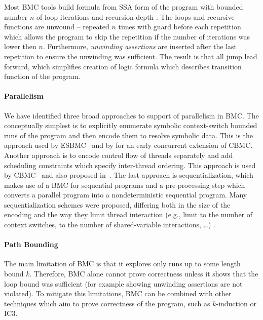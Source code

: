 Most BMC tools build formula from SSA form of the program with bounded number $n$ of loop iterations and recursion depth .
The loops and recursive functions are unwound -- repeated $n$ times with guard before each repetition which allows the program to skip the repetition if the number of iterations was lower then $n$.
Furthermore, \emph{unwinding assertions} are inserted after the last repetition to ensure the unwinding was sufficient.
The result is that all jump lead forward, which simplifies creation of logic formula which describes transition function of the program.

\paragraph{Parallelism}

We have identified three broad approaches to support of parallelism in BMC.
The conceptually simplest is to explicitly enumerate symbolic context-switch
bounded runs of the program and then encode them to resolve symbolic data.
This is the approach used by ESBMC~ and by
 for an early concurrent extension of CBMC.
Another approach is to encode control flow of threads separately and add scheduling constraints which specify inter-thread ordering.
This approach is used by CBMC~ and also proposed in~.
The last approach is sequentialization, which makes use of a BMC for sequential programs and a pre-processing step which converts a parallel program into a nondeterministic sequential program.
Many sequentialization schemes were proposed, differing both in the size of the encoding and the way they limit thread interaction (e.g., limit to the number of context switches, to the number of shared-variable interactions, …) .

\paragraph{Path Bounding}

The main limitation of BMC is that it explores only runs up to some length
bound $k$.
Therefore, BMC alone cannot prove correctness unless it shows that the loop
bound was sufficient (for example showing unwinding assertions are not
violated).
To mitigate this limitations, BMC can be combined with other techniques which
aim to prove correctness of the program, such as $k$-induction or
IC3.

